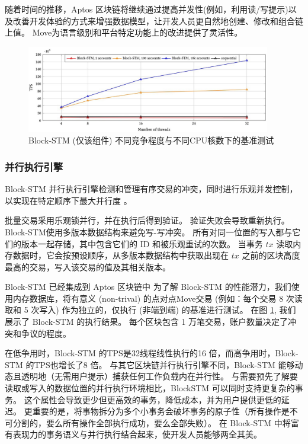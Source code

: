 \documentclass{article}
\begin{document}
随着时间的推移，Aptos 区块链将继续通过提高并发性(例如，利用读/写提示)以及改善开发体验的方式来增强数据模型，让开发人员更自然地创建、修改和组合链上值。 Move为语言级别和平台特定功能上的改进提供了灵活性。

\begin{figure}
\centering
\includegraphics[width=0.95\textwidth]{perf.jpg}
\caption{\label{fig:perf}Block-STM (仅该组件) 不同竞争程度与不同CPU核数下的基准测试}
\end{figure}

\subsubsection{并行执行引擎}

Block-STM 并行执行引擎检测和管理有序交易的冲突，同时进行乐观并发控制，以实现在特定顺序下最大并行度 \cite{block_stm}。

批量交易采用乐观锁并行，并在执行后得到验证。 验证失败会导致重新执行。 Block-STM使用多版本数据结构来避免写-写冲突。 所有对同一位置的写入都与它们的版本一起存储，其中包含它们的 ID 和被乐观重试的次数。 当事务 $tx$ 读取内存数据时，它会按预设顺序，从多版本数据结构中获取出现在 $tx$ 之前的区块高度最高的交易，写入该交易的值及其相关版本。

Block-STM 已经集成到 Aptos 区块链中 为了解 Block-STM 的性能潜力，我们使用内存数据库，将有意义 (non-trival) 的点对点Move交易 (例如：每个交易 8 次读取和 5 次写入) 作为独立的，仅执行 (非端到端) 的基准进行测试。 在图 \ref{fig:perf}, 我们展示了 Block-STM 的执行结果。 每个区块包含 1 万笔交易，账户数量决定了冲突和争议的程度。

在低争用时，Block-STM 的TPS是32线程线性执行的16 倍，而高争用时，Block-STM 的TPS也增长了8 倍。 与其它区块链并行执行引擎不同，Block-STM 能够动态且透明地（无需用户提示）捕获任何工作负载内在并行性。 与需要预先了解要读取或写入的数据位置的并行执行环境相比，BlockSTM 可以同时支持更复杂的事务。 这个属性会导致更少但更高效的事务，降低成本，并为用户提供更低的延迟。 更重要的是，将事物拆分为多个小事务会破坏事务的原子性（所有操作是不可分割的，要么所有操作全部执行成功，要么全部失败）。 在 Block-STM 中将富有表现力的事务语义与并行执行结合起来，使开发人员能够两全其美。
\end{document}
